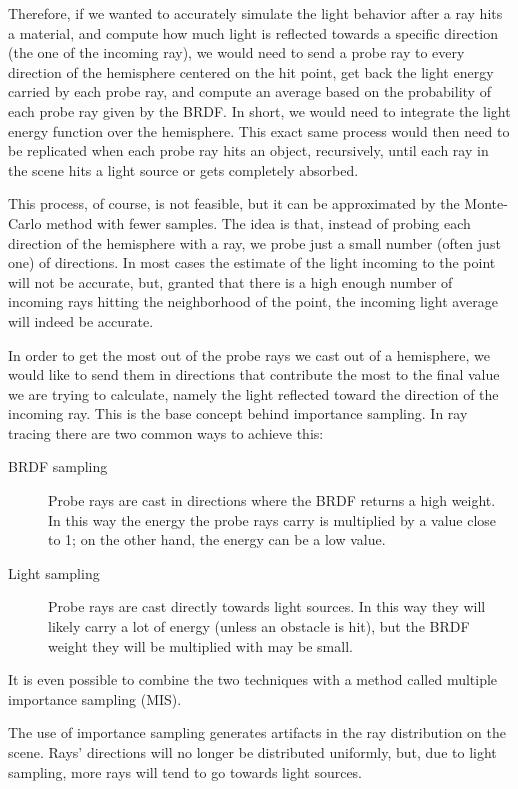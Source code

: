 \documentclass{PoliMi_MasterThesis}
\begin{document}
Therefore, if we wanted to accurately simulate the light behavior after a ray hits a material, and compute how much light is reflected towards a specific direction (the one of the incoming ray), we would need to send a probe ray to every direction of the hemisphere centered on the hit point, get back the light energy carried by each probe ray, and compute an average based on the probability of each probe ray given by the BRDF. In short, we would need to integrate the light energy function over the hemisphere. This exact same process would then need to be replicated when each probe ray hits an object, recursively, until each ray in the scene hits a light source or gets completely absorbed.

This process, of course, is not feasible, but it can be approximated by the Monte-Carlo method with fewer samples. The idea is that, instead of probing each direction of the hemisphere with a ray, we probe just a small number (often just one) of directions. In most cases the estimate of the light incoming to the point will not be accurate, but, granted that there is a high enough number of incoming rays hitting the neighborhood of the point, the incoming light average will indeed be accurate.

In order to get the most out of the probe rays we cast out of a hemisphere, we would like to send them in directions that contribute the most to the final value we are trying to calculate, namely the light reflected toward the direction of the incoming ray. This is the base concept behind importance sampling. In ray tracing there are two common ways to achieve this:
\begin{description}
\item[BRDF sampling] Probe rays are cast in directions where the BRDF returns a high weight. In this way the energy the probe rays carry is multiplied by a value close to 1; on the other hand, the energy can be a low value.
\item[Light sampling] Probe rays are cast directly towards light sources. In this way they will likely carry a lot of energy (unless an obstacle is hit), but the BRDF weight they will be multiplied with may be small.
\end{description}
It is even possible to combine the two techniques with a method called multiple importance sampling (MIS).

The use of importance sampling generates artifacts in the ray distribution on the scene. Rays' directions will no longer be distributed uniformly, but, due to light sampling, more rays will tend to go towards light sources.
\end{document}
